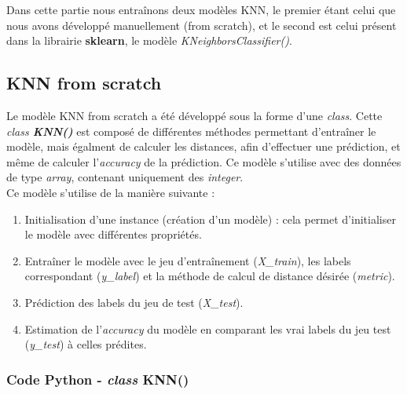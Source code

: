 \documentclass[french]{article}
\begin{document}
Dans cette partie nous entraînons deux modèles KNN, le premier étant celui que nous avons développé manuellement (from scratch), et le second est celui présent dans la librairie \textbf{sklearn}, le modèle \textit{KNeighborsClassifier()}.

\newpage

\subsection{KNN from scratch}

Le modèle KNN from scratch a été développé sous la forme d'une \textit{class}. Cette \textit{class \textbf{KNN()}} est composé de différentes méthodes permettant d'entraîner le modèle, mais égalment de calculer les distances, afin d'effectuer une prédiction, et même de calculer l'\textit{accuracy} de la prédiction. Ce modèle s'utilise avec des données de type \textit{array}, contenant uniquement des \textit{integer}.\\

\noindent Ce modèle s'utilise de la manière suivante :

\begin{enumerate}
    \item Initialisation d'une instance (création d'un modèle) : cela permet d'initialiser le modèle avec différentes propriétés.
    \item Entraîner le modèle avec le jeu d'entraînement (\textit{X\_train}), les labels correspondant (\textit{y\_label}) et la méthode de calcul de distance désirée (\textit{metric}).
    \item Prédiction des labels du jeu de test (\textit{X\_test}).
    \item Estimation de l'\textit{accuracy} du modèle en comparant les vrai labels du jeu test (\textit{y\_test}) à celles prédites.
\end{enumerate}

\subsubsection{Code Python - \textit{class} KNN()}
\end{document}
